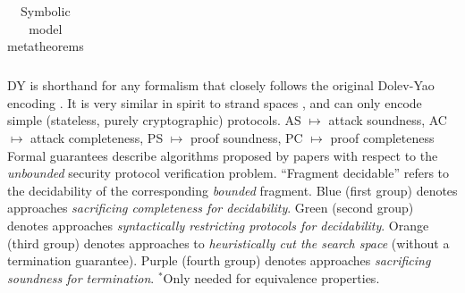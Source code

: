 \begin{table}[h!]
\begin{tabular}{|p{2cm}|p{1.8cm}p{2.6cm}p{2.8cm}p{1.72cm}p{2.6cm}|}
\end{tabular}
\begin{flushleft}
\vspace{0.3em}
DY is shorthand for any formalism that closely follows the original Dolev-Yao encoding 
\cite{dolev_yao}. It is very similar in spirit to strand spaces \cite{strand_spaces}, 
and can only encode simple (stateless, purely cryptographic) protocols. \newline
AS $\mapsto$ attack soundness, AC $\mapsto$ attack completeness, PS $\mapsto$ proof soundness, PC $\mapsto$ proof completeness
\newline\newline
Formal guarantees describe algorithms proposed by papers with respect to the \emph{unbounded} security protocol verification problem. 
``Fragment decidable'' refers to the decidability of the corresponding \emph{bounded} fragment.
\newline\newline
Blue (first group) denotes approaches \emph{sacrificing completeness for decidability}. Green (second group) denotes approaches \emph{syntactically restricting protocols for decidability}. Orange (third group) denotes approaches to \emph{heuristically cut the search space} (without a termination guarantee). Purple (fourth group) denotes approaches \emph{sacrificing soundness for termination}.
\newline\newline
$^*$Only needed for equivalence properties. 
\end{flushleft}

\caption{Symbolic model metatheorems}
\label{tab:metatheorems}
\end{table}

